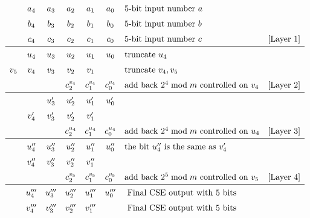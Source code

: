 \documentclass[twoside]{article}
\begin{document}
\begin{center}
\begin{figure}[h!tb]
\begin{displaymath}
\renewcommand\arraystretch{1.5}
\begin{array}{ccccccll}
        & a_4 & a_3 & a_2 & a_1 & a_0 & 5\text{-bit input number } a &\\
        & b_4 & b_3 & b_2 & b_1 & b_0 & 5\text{-bit input number } b & \\
        & c_4 & c_3 & c_2 & c_1 & c_0 & 5\text{-bit input number } c & \text{[Layer 1]}\\
\hline
        & u_4 & u_3 & u_2 & u_1 & u_0 & \text{truncate } u_{4} & \\
    v_5 & v_4 & v_3 & v_2 & v_1 &     & \text{truncate } v_{4},v_{5} & \\
        &     &     & c^{v_4}_2 & c^{v_4}_1 & c^{v_4}_0 & \text{add back } 2^4 \bmod m \text{ controlled on } v_4 & \text{[Layer 2]}\\
\hline
        &      & u'_3 & u'_2 & u'_1 & u'_0 & & \\
        & v'_4 & v'_3 & v'_2 & v'_1 &      & & \\
        &      &    & c^{u_4}_2 & c^{u_4}_1 & c^{u_4}_0  & \text{add back } 2^4 \bmod m \text{ controlled on } u_4 & \text{[Layer 3]}\\
\hline
        & u''_4 & u''_3 & u''_2 & u''_1 & u''_0 & \text{the bit } u''_4 \text{ is the same as } v'_4 & \\
        & v''_4 & v''_3 & v''_2 & v''_1 &       &  & \\
        &       &    & c^{v_5}_2 & c^{v_5}_1 & c^{v_5}_0 & \text{add back } 2^5 \bmod m \text{ controlled on } v_5 & \text{[Layer 4]}\\
\hline
        & u'''_4 & u'''_3 & u'''_2 & u'''_1 & u'''_0 & \text{ Final CSE output with } 5 \text{ bits} &\\
        & v'''_4 & v'''_3 & v'''_2 & v'''_1 &        & \text{ Final CSE output with } 5 \text{ bits} & \\
\end{array}

\end{displaymath}
\end{figure}
\end{center}
\end{document}
